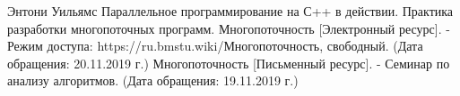 \documentclass[12pt, a4paper]{report}
\begin{document}
	\newpage

\begin{thebibliography}{3}
	Энтони Уильямс Параллельное программирование на С++ в действии. Практика разработки многопоточных программ.
	Многопоточность [Электронный ресурс]. - Режим доступа: https://ru.bmstu.wiki/Многопоточность, свободный. (Дата обращения: 20.11.2019 г.)
	Многопоточность [Письменный ресурс]. - Семинар по анализу алгоритмов. (Дата обращения: 19.11.2019 г.)
\end{thebibliography}
\end{document}
